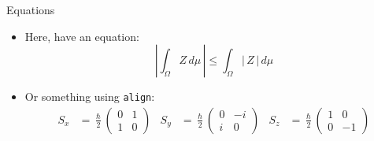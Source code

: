 \documentclass[aspectratio=169]{beamer}    %
\begin{document}
    \begin{frame}{Equations}
        \begin{itemize}
            \item Here, have an equation:
            \[
            \left|\int_{\Omega} Z\, d\mu\,\right|
            \leq \int_{\Omega} |\,Z\,|\, d\mu
            \]
            \item Or something using \texttt{align}:
            \begin{align*}
                S_x &= \frac{\hslash}{2} \begin{pmatrix}
                    0 & 1 \\ 1 & 0 \end{pmatrix} &
                S_y &= \frac{\hslash}{2} \begin{pmatrix}
                    0 & -i \\ i & 0 \end{pmatrix} &
                S_z &= \frac{\hslash}{2} \begin{pmatrix}
                    1 & 0 \\ 0 & -1 \end{pmatrix}
            \end{align*}
        \end{itemize}
    \end{frame}
\end{document}
